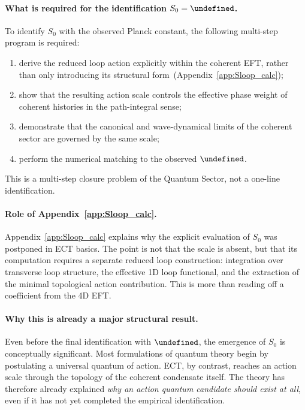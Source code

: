 \documentclass[11pt,a4paper]{article}
\let\hbar\undefined
\numberwithin{equation}{section}
\begin{document}
\paragraph{What is required for the identification $S_0=\hbar$.}
To identify $S_0$ with the observed Planck constant, the following
multi-step program is required:
\begin{enumerate}[label=(\roman*)]
  \item derive the reduced loop action explicitly within the coherent
    EFT, rather than only introducing its structural
    form~(Appendix~\ref{app:Sloop_calc});
  \item show that the resulting action scale controls the effective
    phase weight of coherent histories in the path-integral sense;
  \item demonstrate that the canonical and wave-dynamical limits of the
    coherent sector are governed by the same scale;
  \item perform the numerical matching to the observed $\hbar$.
\end{enumerate}
This is a multi-step closure problem of the Quantum Sector, not a
one-line identification.

\paragraph{Role of Appendix~\ref{app:Sloop_calc}.}
Appendix~\ref{app:Sloop_calc} explains why the explicit evaluation of
$S_0$ was postponed in ECT basics.
The point is not that the scale is absent, but that its computation
requires a separate reduced loop construction: integration over
transverse loop structure, the effective 1D loop functional, and the
extraction of the minimal topological action contribution.
This is more than reading off a coefficient from the 4D EFT.

\paragraph{Why this is already a major structural result.}
Even before the final identification with $\hbar$, the emergence of
$S_0$ is conceptually significant.
Most formulations of quantum theory begin by postulating a universal
quantum of action.
ECT, by contrast, reaches an action scale through the topology of the
coherent condensate itself.
The theory has therefore already explained \emph{why an action quantum
candidate should exist at all}, even if it has not yet completed the
empirical identification.
\end{document}
